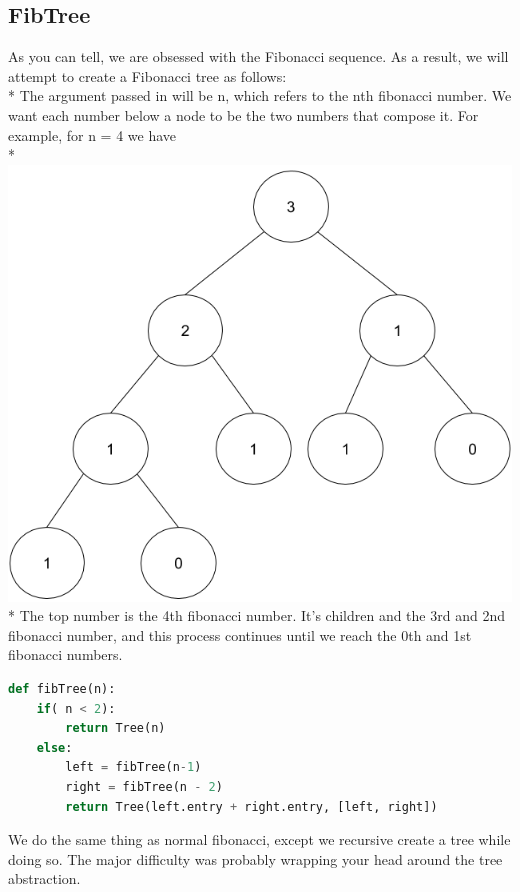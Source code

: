 \documentclass{article}
\begin{document}
\subsection{FibTree}
As you can tell, we are obsessed with the Fibonacci sequence. As a result, we will attempt to create a Fibonacci tree as follows: \\*
\bigskip
The argument passed in will be n, which refers to the nth fibonacci number. We want each number below a node to be the two numbers that compose it. For example, for n = 4 we have \\*
\includegraphics[scale=.35]{../images/fibtree} \\*
The top number is the 4th fibonacci number. It's children and the 3rd and 2nd fibonacci number, and this process continues until we reach the 0th and 1st fibonacci numbers. 
\begin{solution}
\begin{lstlisting}[language = Python]
def fibTree(n):
    if( n < 2):
        return Tree(n)
    else:
        left = fibTree(n-1)
        right = fibTree(n - 2)
        return Tree(left.entry + right.entry, [left, right])
\end{lstlisting}
We do the same thing as normal fibonacci, except we recursive create a tree while doing so. The major difficulty was probably wrapping your head around the tree abstraction. 
\end{solution}
\end{document}
